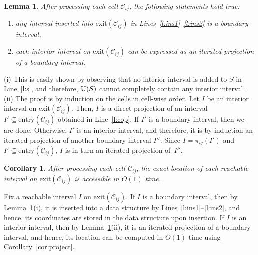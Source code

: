 \documentclass[12pt]{dalthesis}
\def\favoritefont{\bfseries \sffamily}
\def\QED{\ensuremath{{\Box}}}
\def\markatright#1{\leavevmode\unskip\nobreak\quad\hspace*{\fill}{#1}}
\newenvironment{proof}
	{\begin{trivlist}\item[\hskip\labelsep{\favoritefont Proof:}]}
	{\markatright{\QED}\end{trivlist}}
\newtheorem{lemma}[theorem]{Lemma}
\newtheorem{corollary}[theorem]{Corollary}
\newcommand{\CC}{{\mathscr C}}
\newcommand{\cell}[1]{{\CC_{#1}}}
\newcommand{\entry}[1]{\mbox{entry}(\cell{#1})}
\newcommand{\exit}[1]{\mbox{exit}(\cell{#1})}
\newcommand{\proj}[1]{\pi_{#1}}
\newcommand{\union}{\mbox{\sc U}}
\begin{document}
\begin{lemma} \label{lemma:prop}
	After processing each cell $\cell{ij}$, 
	the following statements hold true:
	\begin{enumerate}
		\item[\em (i)] any interval inserted into $\exit{ij}$ in Lines~\ref{l:ins1}--\ref{l:ins2} is a boundary interval,
		\item[\em (ii)] each interior interval on $\exit{ij}$	can be expressed as an iterated projection of a boundary interval.
\end{enumerate}
\end{lemma}
\begin{proof}
	(i) This is easily shown by observing that no interior interval is added to $S$ in Line~\ref{l:s},
	and therefore, $\union(S)$ cannot completely contain any interior interval.
	(ii) The proof is by induction on the cells in cell-wise order.
	Let $I$ be an interior interval on $\exit{ij}$. 
	Then, $I$ is a direct projection of an interval $I' \subseteq \entry{ij}$ obtained in  Line~\ref{l:cop}.
	If $I'$ is a boundary interval, then we are done.
	Otherwise, $I'$ is an interior interval, and therefore, 
	it is by induction an iterated projection of another boundary interval $I''$.
	Since $I = \proj{ij}(I')$ and $I' \subseteq \entry{ij}$,
	$I$ is in turn an iterated projection of~$I''$.
\end{proof}

\begin{corollary} \label{cor:const}
	After processing each cell $\cell{ij}$, 
	the exact location of each reachable interval on $\exit{ij}$ is accessible in $O(1)$ time.
\end{corollary}

\begin{proof}
	Fix a reachable interval $I$ on $\exit{ij}$.
	If $I$ is a boundary interval, then by Lemma~\ref{lemma:prop}(i), 
	it is inserted into a data structure by Lines~\ref{l:ins1}--\ref{l:ins2},
	and hence, its coordinates are stored in the data structure upon insertion.
	If $I$ is an interior interval, then by Lemma~\ref{lemma:prop}(ii),
	it is an iterated projection of a boundary interval, and hence, its location
	can be computed in $O(1)$ time using Corollary~\ref{cor:project}.
\end{proof}
\end{document}
